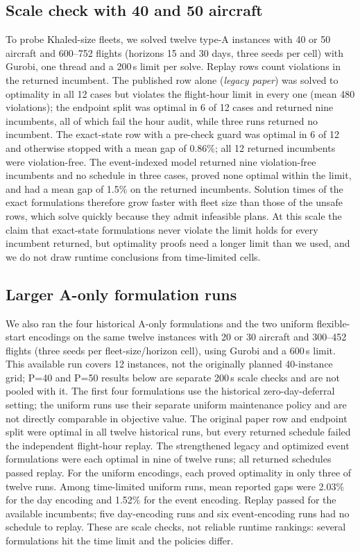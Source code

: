 \subsection{Scale check with 40 and 50 aircraft}
\label{subsec:p4050}

To probe Khaled-size fleets, we solved twelve type-A instances with 40 or 50
aircraft and 600--752 flights (horizons 15 and 30 days, three seeds per cell)
with Gurobi, one thread and a 200\,s limit per solve. Replay rows count
violations in the returned incumbent. The published row alone
(\emph{legacy paper}) was solved to optimality in all 12 cases but violates
the flight-hour limit in every one (mean 480 violations); the endpoint split
was optimal in 6 of 12 cases and returned nine incumbents, all of which fail
the hour audit, while three runs returned no incumbent. The exact-state row
with a pre-check guard was optimal in 6 of 12 and otherwise stopped with a
mean gap of 0.86\%; all 12 returned incumbents were violation-free. The
event-indexed model returned nine violation-free incumbents and no schedule in
three cases, proved none optimal within the limit, and had a mean gap of 1.5\%
on the returned incumbents. Solution times of the exact formulations therefore grow faster with
fleet size than those of the unsafe rows, which solve quickly because they
admit infeasible plans. At this scale the claim that exact-state formulations
never violate the limit holds for every incumbent returned, but optimality
proofs need a longer limit than we used, and we do not draw runtime
conclusions from time-limited cells.

\subsection{Larger A-only formulation runs}
\label{subsec:large_a_only}

We also ran the four historical A-only formulations and the two uniform
flexible-start encodings on the same twelve instances with 20 or 30 aircraft
and 300--452 flights (three seeds per fleet-size/horizon cell), using Gurobi
and a 600\,s limit. This available run covers 12 instances, not the originally
planned 40-instance grid; P=40 and P=50 results below are separate 200\,s
scale checks and are not pooled with it. The first four formulations use the historical
zero-day-deferral setting; the uniform runs use their separate uniform
maintenance policy and are not directly comparable in objective value. The
original paper row and endpoint split were optimal in all twelve historical
runs, but every returned schedule failed the independent flight-hour replay.
The strengthened legacy and optimized event formulations were each optimal in
nine of twelve runs; all returned schedules passed replay. For the uniform
encodings, each proved optimality in only three of twelve runs. Among
time-limited uniform runs, mean reported gaps were 2.03\% for the day encoding
and 1.52\% for the event encoding. Replay passed for the available incumbents;
five day-encoding runs and six event-encoding runs had no schedule to replay.
These are scale checks, not reliable runtime rankings: several formulations
hit the time limit and the policies differ.

